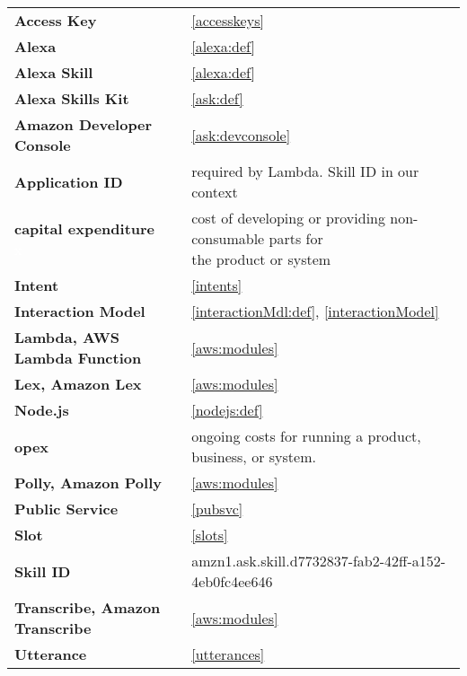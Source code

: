 \begin{flushleft}
\begin{tabular}{ll}

\textbf{Access Key}			&	 	\ref{accesskeys}\\


\textbf{Alexa}				&		\ref{alexa:def}\\
\textbf{Alexa Skill}		&		\ref{alexa:def}\\
\textbf{Alexa Skills Kit}	&		\ref{ask:def}\\
\textbf{Amazon Developer Console}&	\ref{ask:devconsole}\\

\textbf{Application ID}		&	required by Lambda. Skill ID in our context\\

\shortstack[l]{\textbf{capital expenditure}\\ \textcolor{white}{x}}	&	\shortstack[l]{cost of developing or providing non-consumable parts for \\ the product or system}\\


\textbf{Intent}				&		\ref{intents}\\
\textbf{Interaction Model}	&		\ref{interactionMdl:def}, \ref{interactionModel}\\



\textbf{Lambda, AWS Lambda Function}	&		\ref{aws:modules}\\
\textbf{Lex, Amazon Lex}	&		\ref{aws:modules}\\

\textbf{Node.js}			&		\ref{nodejs:def}\\

\textbf{opex}				&  ongoing costs for running a product, business, or system. \\


\textbf{Polly, Amazon Polly}&		\ref{aws:modules}\\
\textbf{Public Service}			&	\ref{pubsvc}\\
\textbf{Slot}				&		\ref{slots}\\
\textbf{Skill ID}			&	amzn1.ask.skill.d7732837-fab2-42ff-a152-4eb0fc4ee646\\
\textbf{Transcribe, Amazon Transcribe}	&		\ref{aws:modules}\\

\textbf{Utterance}			&		\ref{utterances}\\


\end{tabular}
\end{flushleft}
